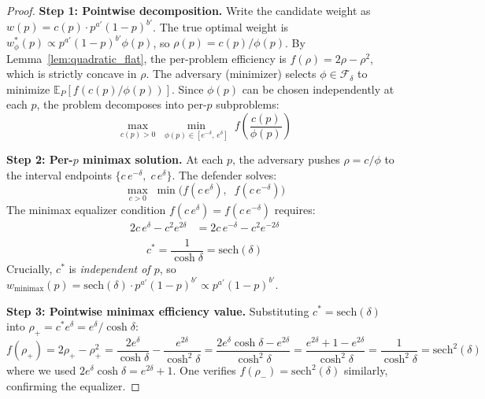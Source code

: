 \documentclass{article}
\begin{document}
\begin{proof}
\textbf{Step 1: Pointwise decomposition.}
Write the candidate weight as $w(p) = c(p)\cdot p^{a'}(1-p)^{b'}$. The true optimal weight is $w^*_\phi(p) \propto p^{a'}(1-p)^{b'}\phi(p)$, so $\rho(p) = c(p)/\phi(p)$. By Lemma~\ref{lem:quadratic_flat}, the per-problem efficiency is $f(\rho) = 2\rho - \rho^2$, which is strictly concave in $\rho$. The adversary (minimizer) selects $\phi \in \mathcal{F}_\delta$ to minimize $\mathbb{E}_P[f(c(p)/\phi(p))]$. Since $\phi(p)$ can be chosen independently at each $p$, the problem decomposes into per-$p$ subproblems:
\begin{equation}
  \max_{c(p) > 0}\;\min_{\phi(p) \in [e^{-\delta},\, e^{\delta}]}\; f\!\left(\frac{c(p)}{\phi(p)}\right)
\end{equation}

\textbf{Step 2: Per-$p$ minimax solution.}
At each $p$, the adversary pushes $\rho = c/\phi$ to the interval endpoints $\{c\,e^{-\delta},\; c\,e^{\delta}\}$. The defender solves:
\begin{equation}
  \max_{c > 0}\;\min\!\Big(f(c\,e^{\delta}),\;\; f(c\,e^{-\delta})\Big)
\end{equation}
The minimax equalizer condition $f(c\,e^{\delta}) = f(c\,e^{-\delta})$ requires:
\begin{align}
  2c\,e^{\delta} - c^2 e^{2\delta} &= 2c\,e^{-\delta} - c^2 e^{-2\delta} \nonumber\\
\end{align}
\begin{equation}
  c^* = \frac{1}{\cosh\delta} = \mathrm{sech}(\delta)
\end{equation}
Crucially, $c^*$ is \emph{independent of $p$}, so $w_{\mathrm{minimax}}(p) = \mathrm{sech}(\delta)\cdot p^{a'}(1-p)^{b'} \propto p^{a'}(1-p)^{b'}$.

\textbf{Step 3: Pointwise minimax efficiency value.}
Substituting $c^* = \mathrm{sech}(\delta)$ into $\rho_+ = c^* e^{\delta} = e^{\delta}/\cosh\delta$:
\begin{equation}
  f(\rho_+) = 2\rho_+ - \rho_+^2 = \frac{2e^{\delta}}{\cosh\delta} - \frac{e^{2\delta}}{\cosh^2\delta} = \frac{2e^{\delta}\cosh\delta - e^{2\delta}}{\cosh^2\delta} = \frac{e^{2\delta} + 1 - e^{2\delta}}{\cosh^2\delta} = \frac{1}{\cosh^2\delta} = \mathrm{sech}^2(\delta)
\end{equation}
where we used $2e^{\delta}\cosh\delta = e^{2\delta} + 1$. One verifies $f(\rho_-) = \mathrm{sech}^2(\delta)$ similarly, confirming the equalizer.


\end{proof}
\end{document}
